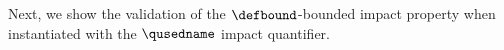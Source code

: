 Next, we show the validation of the $\defbound$-bounded impact property when instantiated with the $\qusedname$ impact quantifier.

